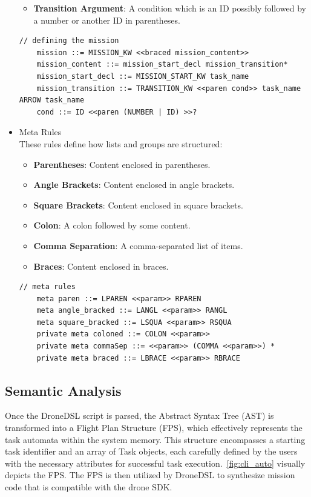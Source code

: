 \begin{itemize}
\begin{itemize}
        \item \textbf{Transition Argument}: A condition which is an ID possibly followed by a number or another ID in parentheses.
    \end{itemize}
    \begin{lstlisting}[style=customgo]
    // defining the mission
    mission ::= MISSION_KW <<braced mission_content>>
    mission_content ::= mission_start_decl mission_transition*
    mission_start_decl ::= MISSION_START_KW task_name
    mission_transition ::= TRANSITION_KW <<paren cond>> task_name ARROW task_name
    cond ::= ID <<paren (NUMBER | ID) >>?
    \end{lstlisting}
    \item Meta Rules \\
    These rules define how lists and groups are structured:
    \begin{itemize}
        \item \textbf{Parentheses}: Content enclosed in parentheses.
        \item \textbf{Angle Brackets}: Content enclosed in angle brackets.
        \item \textbf{Square Brackets}: Content enclosed in square brackets.
        \item \textbf{Colon}: A colon followed by some content.
        \item \textbf{Comma Separation}: A comma-separated list of items.
        \item \textbf{Braces}: Content enclosed in braces.
    \end{itemize}
    \begin{lstlisting}[style=customgo]
    // meta rules
    meta paren ::= LPAREN <<param>> RPAREN
    meta angle_bracked ::= LANGL <<param>> RANGL
    meta square_bracked ::= LSQUA <<param>> RSQUA
    private meta coloned ::= COLON <<param>>
    private meta commaSep ::= <<param>> (COMMA <<param>>) *
    private meta braced ::= LBRACE <<param>> RBRACE
    \end{lstlisting}
\end{itemize}


\subsection{Semantic Analysis}
Once the DroneDSL script is parsed, the Abstract Syntax Tree (AST) is transformed into a Flight Plan Structure (FPS), which effectively represents the task automata within the system memory. This structure encompasses a starting task identifier and an array of Task objects, each carefully defined by the users with the necessary attributes for successful task execution.~\ref{fig:cli_auto} visually depicts the FPS. The FPS is then utilized by DroneDSL to synthesize mission code that is compatible with the drone SDK.

